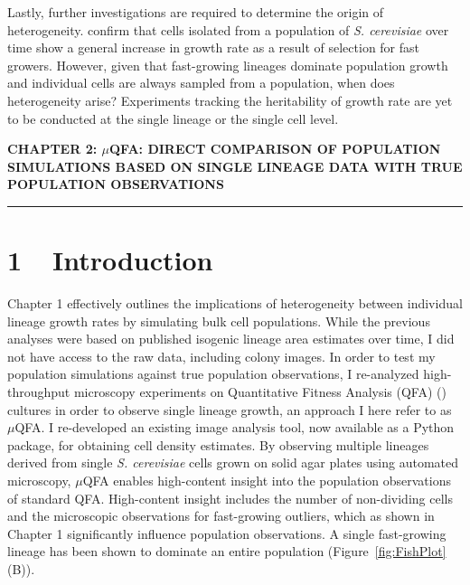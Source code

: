 \documentclass{bioinfo}
\begin{document}
{Lastly, further investigations are required to determine the origin of heterogeneity. \cite{Jasmin12} confirm that cells isolated from a population of \textit{S. cerevisiae} over time show a general increase in growth rate as a result of selection for fast growers. However, given that fast-growing lineages dominate population growth and individual cells are always sampled from a population, when does heterogeneity arise? Experiments tracking the heritability of growth rate are yet to be conducted at the single lineage or the single cell level. 

\vspace{+2em}
\noindent
\textbf{\large{CHAPTER 2: $\mu$QFA:  DIRECT COMPARISON OF POPULATION SIMULATIONS BASED ON SINGLE LINEAGE DATA WITH TRUE POPULATION OBSERVATIONS}}\\
\noindent\rule[0.5ex]{\linewidth}{1pt}
\vspace{-3em}

\section*{1 $\>\>$ Introduction}

Chapter 1 effectively outlines the implications of heterogeneity between individual lineage growth rates by simulating bulk cell populations. While the previous analyses were based on published isogenic lineage area estimates over time, I did not have access to the raw data, including colony images. In order to test my population simulations against true population observations, I re-analyzed high-throughput microscopy experiments on Quantitative Fitness Analysis (QFA) (\citealp{Addinall11}) cultures in order to observe single lineage growth, an approach I here refer to as $\mu$QFA. I re-developed an existing image analysis tool, now available as a Python package, for obtaining cell density estimates. By observing multiple lineages derived from single \textit{S. cerevisiae} cells grown on solid agar plates using automated microscopy, $\mu$QFA enables high-content insight into the population observations of standard QFA. High-content insight includes the number of non-dividing cells and the microscopic observations for fast-growing outliers, which as shown in Chapter 1 significantly influence population observations. A single fast-growing lineage has been shown to dominate an entire population (Figure~\ref{fig:FishPlot} (B)). 

}
\end{document}
